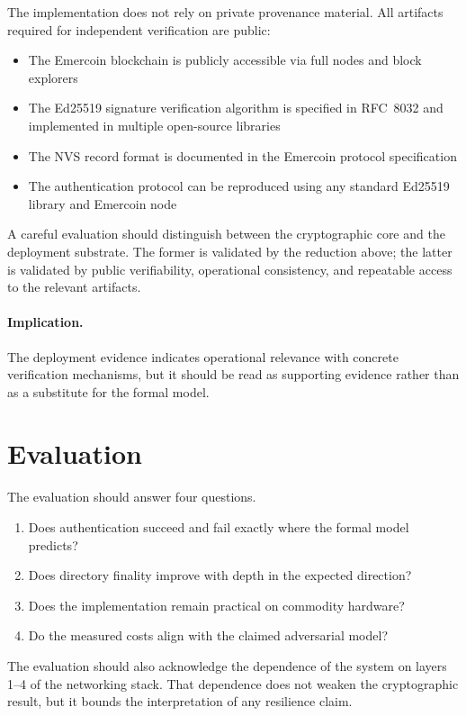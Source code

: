 \documentclass[11pt,a4paper]{article}
\begin{document}
The implementation does not rely on private provenance material. All artifacts required for independent verification are public:

\begin{itemize}[leftmargin=*]
  \item The Emercoin blockchain is publicly accessible via full nodes and block explorers
  \item The Ed25519 signature verification algorithm is specified in RFC~8032 and implemented in multiple open-source libraries
  \item The NVS record format is documented in the Emercoin protocol specification
  \item The authentication protocol can be reproduced using any standard Ed25519 library and Emercoin node
\end{itemize}

A careful evaluation should distinguish between the cryptographic core and the deployment substrate. The former is validated by the reduction above; the latter is validated by public verifiability, operational consistency, and repeatable access to the relevant artifacts.

\paragraph{Implication.} The deployment evidence indicates operational relevance with concrete verification mechanisms, but it should be read as supporting evidence rather than as a substitute for the formal model.

\section{Evaluation}

The evaluation should answer four questions.
\begin{enumerate}[leftmargin=*]
  \item Does authentication succeed and fail exactly where the formal model predicts?
  \item Does directory finality improve with depth in the expected direction?
  \item Does the implementation remain practical on commodity hardware?
  \item Do the measured costs align with the claimed adversarial model?
\end{enumerate}

The evaluation should also acknowledge the dependence of the system on layers 1--4 of the networking stack. That dependence does not weaken the cryptographic result, but it bounds the interpretation of any resilience claim.
\end{document}
